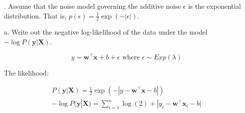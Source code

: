 \documentclass[12pt]{article}
\begin{document}
    . Assume that the noise model governing the additive noise \(\epsilon \) is the 
    exponential distribution. That is, \(p(\epsilon) = \frac{1}{2}\exp(-|\epsilon|)\).

    a. Write out the negative log-likelihood of the data under the model \(-\log P(\bm{y}  |  \bm{X})\).

    \[y = \bm{w} ^ \top \bm{x} + b + \epsilon  \text{ where }  \epsilon \sim Exp(\lambda)\]

    The likelihood:

    \begin{gather*}
        P(\bm{y} | \bm{X}) = \frac{1}{2} \exp (-|y - \bm{w} ^ \top \bm{x} - b|) \\
        -\log P(\bm{y} | \bm{X}) = \sum_{i=1}^{n} \log (2) + |y_i - \bm{w} ^ \top \bm{x}_i - b| 
    \end{gather*}
\end{document}
